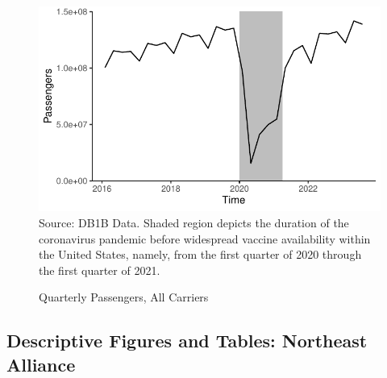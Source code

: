 \documentclass{article}
\let\Oldsubsection\subsection
\renewcommand{\subsection}{\FloatBarrier\Oldsubsection}
\begin{document}
\begin{appendices}
\begin{figure}
	\caption{Quarterly Passengers, All Carriers}
	\label{fig:QuarterlyPass}
	\includegraphics[width = \linewidth]{Quarterly_DB1B_Itineraries}
	\footnotesize{Source: DB1B Data. Shaded region depicts the duration of the coronavirus pandemic before widespread vaccine availability within the United States, namely, from the first quarter of 2020 through the first quarter of 2021.}
\end{figure}

\FloatBarrier

	\subsection{Descriptive Figures and Tables: Northeast Alliance}


\end{appendices}
\end{document}
